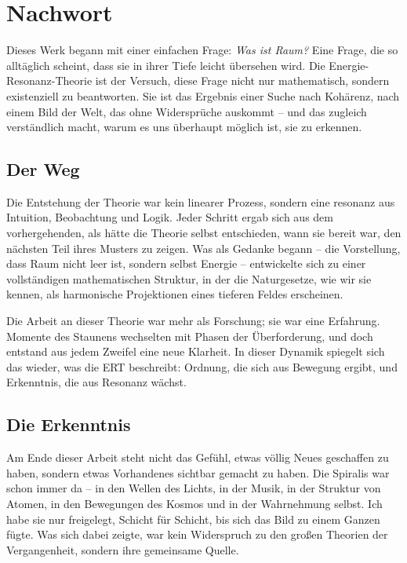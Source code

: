 \chapter{Nachwort}
\label{chap:nachwort}

Dieses Werk begann mit einer einfachen Frage: \emph{Was ist Raum?}  
Eine Frage, die so alltäglich scheint, dass sie in ihrer Tiefe leicht übersehen wird.  
Die Energie-Resonanz-Theorie ist der Versuch, diese Frage nicht nur mathematisch, sondern existenziell zu beantworten.  
Sie ist das Ergebnis einer Suche nach Kohärenz, nach einem Bild der Welt, das ohne Widersprüche auskommt –  
und das zugleich verständlich macht, warum es uns überhaupt möglich ist, sie zu erkennen.

\section*{Der Weg}
Die Entstehung der Theorie war kein linearer Prozess, sondern eine \gls{resonanz} aus Intuition, Beobachtung und Logik.  
Jeder Schritt ergab sich aus dem vorhergehenden, als hätte die Theorie selbst entschieden, wann sie bereit war, den nächsten Teil ihres Musters zu zeigen.  
Was als Gedanke begann – die Vorstellung, dass Raum nicht leer ist, sondern selbst Energie –  
entwickelte sich zu einer vollständigen mathematischen Struktur,  
in der die Naturgesetze, wie wir sie kennen, als harmonische Projektionen eines tieferen Feldes erscheinen.  

Die Arbeit an dieser Theorie war mehr als Forschung; sie war eine Erfahrung.  
Momente des Staunens wechselten mit Phasen der Überforderung,  
und doch entstand aus jedem Zweifel eine neue Klarheit.  
In dieser Dynamik spiegelt sich das wieder, was die \acrshort{ERT} beschreibt:  
Ordnung, die sich aus Bewegung ergibt,  
und Erkenntnis, die aus Resonanz wächst.

\section*{Die Erkenntnis}
Am Ende dieser Arbeit steht nicht das Gefühl, etwas völlig Neues geschaffen zu haben,  
sondern etwas Vorhandenes sichtbar gemacht zu haben.  
Die Spiralis war schon immer da – in den Wellen des Lichts,  
in der Musik, in der Struktur von Atomen,  
in den Bewegungen des Kosmos und in der Wahrnehmung selbst.  
Ich habe sie nur freigelegt, Schicht für Schicht,  
bis sich das Bild zu einem Ganzen fügte.  
Was sich dabei zeigte, war kein Widerspruch zu den großen Theorien der Vergangenheit,  
sondern ihre gemeinsame Quelle.

